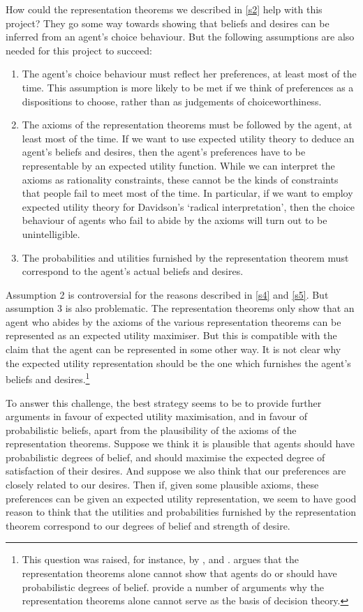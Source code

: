 How could the representation theorems we described in \autoref{s2} help with this project? They go some way towards showing that beliefs and desires can be inferred from an agent's choice behaviour. But the following assumptions are also needed for this project to succeed:
\begin{enumerate}
\item The agent's choice behaviour must reflect her preferences, at least most of the time. This assumption is more likely to be met if we think of preferences as a dispositions to choose, rather than as judgements of choiceworthiness.
\item The axioms of the representation theorems must be followed by the agent, at least most of the time. If we want to use expected utility theory to deduce an agent's beliefs and desires, then the agent's preferences have to be representable by an expected utility function. While we can interpret the axioms as rationality constraints, these cannot be the kinds of constraints that people fail to meet most of the time. In particular, if we want to employ expected utility theory for Davidson's `radical interpretation', then the choice behaviour of agents who fail to abide by the axioms will turn out to be unintelligible.
\item The probabilities and utilities furnished by the representation theorem must correspond to the agent's actual beliefs and desires.
\end{enumerate}

Assumption 2 is controversial for the reasons described in \autoref{s4} and \autoref{s5}. But assumption 3 is also problematic. The representation theorems only show that an agent who abides by the axioms of the various representation theorems can be represented as an expected utility maximiser. But this is compatible with the claim that the agent can be represented in some other way. It is not clear why the expected utility representation should be the one which furnishes the agent's beliefs and desires.\footnote{This question was raised, for instance, by \citet{Zynda2000}, \citet{Hajek2008} and \citet{MeachamWeisberg2011}. \citet{Zynda2000} argues that the representation theorems alone cannot show that agents do or should have probabilistic degrees of belief. \citet{MeachamWeisberg2011} provide a number of arguments why the representation theorems alone cannot serve as the basis of decision theory.}

To answer this challenge, the best strategy seems to be to provide further arguments in favour of expected utility maximisation, and in favour of probabilistic beliefs, apart from the plausibility of the axioms of the representation theorems. Suppose we think it is plausible that agents should have probabilistic degrees of belief, and should maximise the expected degree of satisfaction of their desires. And suppose we also think that our preferences are closely related to our desires. Then if, given some plausible axioms, these preferences can be given an expected utility representation, we seem to have good reason to think that the utilities and probabilities furnished by the representation theorem correspond to our degrees of belief and strength of desire.

